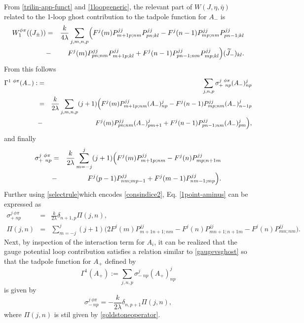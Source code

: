 \documentclass[11pt]{book}
\theoremstyle{break}
\begin{document}
From \eqref{trilin-app-funct} and \eqref{1loopgeneric}, the relevant part of $W(J,\eta,\bar\eta)$ related to the 1-loop ghost contribution to the tadpole function for $A_-$ is
\begin{eqnarray}
W^{\phi\pi}_1((J_\pm))&=&\frac{k}{4\lambda}\sum_{j,m,n,p}\Bigl(F^j(m)P^{jj}_{m+1p;nm}P^{jj}_{pn;kl}-F^j(n-1)P^{jj}_{mp;nm}P^{jj}_{pn-1;kl}\nonumber\\ &-&F^j(m)P^{jj}_{pn;nm}P^{jj}_{m+1p;kl}+F^j(n-1)P^{jj}_{pn-1;nm}P^{jj}_{mp;kl}\Bigr)(\widetilde J_-)_{kl}.
\end{eqnarray}
From this follows
\begin{eqnarray}
\Gamma^{1\ \phi\pi}(A_-):&=&\sum_{j,n,p}\sigma^{j\ \phi\pi}_{+\ np}(A_-)^j_{np}\nonumber\\
&=&\frac{k}{2\lambda}\sum_{j,m,n,p}(j+1)\Bigl(F^j(m)P^{jj}_{m+1p;nm}(A_-)^j_{np}-F^j(n-1)P^{jj}_{mp;nm}(A_-)^j_{n-1p}\nonumber\\ &-&F^j(m)P^{jj}_{pn;nm}(A_-)^j_{pm+1}+F^j(n-1)P^{jj}_{pn-1;nm}(A_-)^j_{pm}\Bigr),
\end{eqnarray}
and finally
\begin{eqnarray}
\sigma^{j\ \phi\pi}_{+\ np}&=&\frac{k}{2\lambda}\sum_{m=-j}^j(j+1)\Bigl(F^j(m)P^{jj}_{m+1p;nm}-F^j(n)P^{jj}_{mp;n+1m}\nonumber\\
&-&F^j(p-1)P^{jj}_{nm;mp-1}+F^j(m-1)P^{jj}_{nm-1;mp}\Bigr)\label{1point-aminus}.
\end{eqnarray}
Further using \eqref{selectrule}which encodes \eqref{consindice2}, Eq. \eqref{1point-aminus} can be expressed as
\begin{eqnarray}
\sigma^{j\ \phi\pi}_{+\ np}&=&\frac{k}{2\lambda}\delta_{n+1,p}\Pi(j,n),\label{tadpole-aminus}\\
\Pi(j,n)&=&\sum_{m=-j}^j(j+1)\big(2F^j(m)P^{jj}_{m+1n+1;nm}-F^j(n)P^{jj}_{mn+1;n+1m}-F^j(n)P^{jj}_{mn;nm}\big)\label{goldstoneoperator}.
\end{eqnarray}
Next, by inspection of the interaction term for $A_i$, it can be realized that the gauge potential loop contribution satisfies a relation similar to \eqref{gaugevsghost} so that the tadpole function for $A_+$ defined by
\begin{equation}
\Gamma^{1}(A_+):=\sum_{j,n,p}\sigma^{j}_{-\ np}(A_+)^j_{np}
\end{equation}
is given by
\begin{equation}
\sigma^{j\ \phi\pi}_{-\ np}=-\frac{k}{2\lambda}\delta_{n,p+1}\Pi(j,n)\label{tadpole-aplus}, 
\end{equation}
where $\Pi(j,n)$ is stil given by \eqref{goldstoneoperator}.\par
\end{document}
